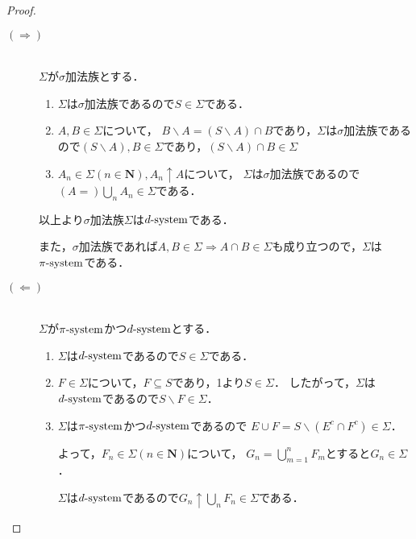 \documentclass{jsarticle}
\begin{document}
\begin{proof}
    \begin{description}
        \item[$(\Rightarrow)$]\mbox{}\\
            $\Sigma$が$\sigma$加法族とする．
            \begin{enumerate}
                \item
                    $\Sigma$は$\sigma$加法族であるので$S\in \Sigma$である．
                \item
                    $A,B\in\Sigma$について，
                    $B\backslash A=(S\backslash A)\cap B$であり，$\Sigma$は$\sigma$加法族であるので$(S\backslash A),B\in\Sigma$であり，$(S\backslash A)\cap B\in\Sigma$
                \item
                    $A_n\in\Sigma(n\in\mathbf{N}),A_n\uparrow A$について，
                    $\Sigma$は$\sigma$加法族であるので$(A=)\bigcup_n A_n\in\Sigma$である．
            \end{enumerate}
            以上より$\sigma$加法族$\Sigma$は$d{\rm \text{-}system}$である．
            
            また，$\sigma$加法族であれば$A,B\in\Sigma \Rightarrow A\cap B\in\Sigma$も成り立つので，$\Sigma$は$\pi{\rm \text{-}system}$である．
        \item[$(\Leftarrow)$]\mbox{}\\
            $\Sigma$が$\pi{\rm \text{-}system}$かつ$d{\rm \text{-}system}$とする．
            \begin{enumerate}
                \item
                    $\Sigma$は$d{\rm \text{-}system}$であるので$S\in \Sigma$である．
                \item
                    $F\in\Sigma$について，$F\subseteq S$であり，1より$S\in\Sigma$．
                    したがって，$\Sigma$は$d{\rm \text{-}system}$であるので$S\backslash F\in\Sigma$．
                \item
                    $\Sigma$は$\pi{\rm \text{-}system}$かつ$d{\rm \text{-}system}$であるので
                    $E\cup F=S\backslash(E^c\cap F^c)\in\Sigma$．
                
                    よって，$F_n\in\Sigma(n\in\mathbf{N})$について，
                    $G_n=\bigcup_{m=1}^n F_m$とすると$G_n\in\Sigma$．
                    
                    $\Sigma$は$d{\rm \text{-}system}$であるので$G_n\uparrow\bigcup_n F_n\in\Sigma$である． 
            \end{enumerate}
    \end{description}
\end{proof}
\end{document}
